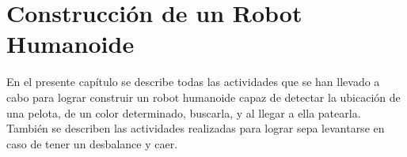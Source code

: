 \chapter{Construcci\'on de un Robot Humanoide}\label{chapter:introAdesarrollo}

En el presente capítulo se describe todas las actividades que se han llevado a cabo para lograr construir un robot humanoide capaz de detectar la ubicación de una pelota, de un color determinado, buscarla, y al llegar a ella patearla. También se describen las actividades realizadas para lograr sepa levantarse en caso de tener un desbalance y caer.  



